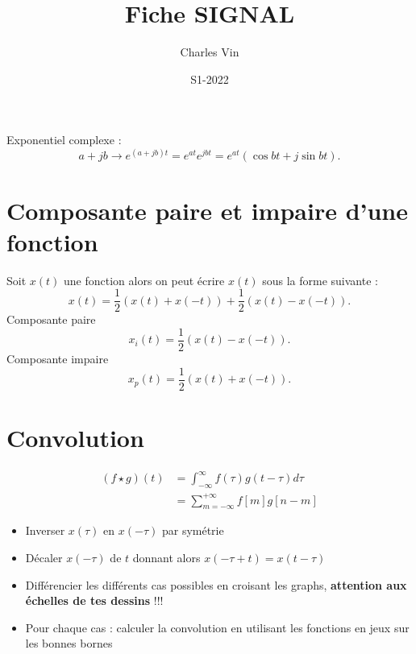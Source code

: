 \documentclass{article}
\title{Fiche SIGNAL}
\author{Charles Vin}
\date{S1-2022}
\theoremstyle{plain}%
\theoremstyle{definition}
\theoremstyle{remark}
\begin{document}
\maketitle
Exponentiel complexe : 
\[
    a + jb \to e^{(a+jb)t} = e^{at}e^{jbt} = e^{at}(\cos bt + j \sin bt)
.\]

\section{Composante paire et impaire d'une fonction}
Soit $ x(t) $ une fonction alors on peut écrire $ x(t) $ sous la forme suivante : 
\[
    x(t) = \frac{1}{2}(x(t) + x(-t)) + \frac{1}{2}(x(t) - x(-t))
.\]
Composante paire 
\[
    x_i(t) = \frac{1}{2}(x(t) - x(-t))
.\]
Composante impaire 
\[
    x_p(t) = \frac{1}{2}(x(t) + x(-t))
.\]

\section{Convolution}
\begin{align*}
    (f \star g)(t) &= \int _{-\infty }^{\infty }f(\tau )g(t-\tau )d\tau \\
                    &= \sum_{m=-\infty }^{+\infty} f[m]g[n - m]
\end{align*}

\begin{itemize}
    \item Inverser $ x(\tau ) $ en $ x(-\tau) $ par symétrie
    \item Décaler $ x(-\tau) $ de $ t $ donnant alors $ x(- \tau + t ) = x(t - \tau )$ 
    \item Différencier les différents cas possibles en croisant les graphs, \textbf{attention aux échelles de tes dessins} !!! 
    \item Pour chaque cas : calculer la convolution en utilisant les fonctions en jeux sur les bonnes bornes
\end{itemize}
\end{document}
